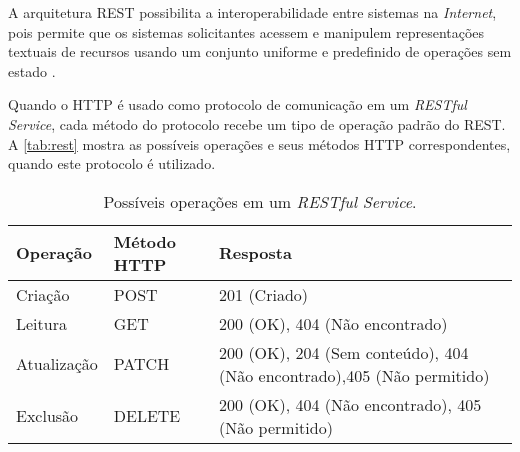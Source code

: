 	A arquitetura REST possibilita a interoperabilidade entre sistemas na \textit{Internet}, pois permite que os sistemas solicitantes acessem e manipulem representações textuais de recursos usando um conjunto uniforme e predefinido de operações sem estado \cite{ferris2004webservices}.
	
	Quando o HTTP é usado como protocolo de comunicação em um \textit{RESTful Service}, cada método do protocolo recebe um tipo de operação padrão do REST. A \autoref{tab:rest} mostra as possíveis operações e seus métodos HTTP correspondentes, quando este protocolo é utilizado.
	

	\begin{table}[htb]
		\centering
		\footnotesize
		\caption{Possíveis operações em um \textit{RESTful Service}.}
		\label{tab:rest}
		\begin{tabular}{p{2cm}p{2cm}p{8cm}}
			\hline
			\textbf{Operação} &
			\textbf{Método \newline HTTP} &
			\textbf{Resposta} \\[5mm]

			\hline
			Criação &
			POST &
			201 (Criado) \\[5mm]
			
			\hline
			Leitura &
			GET &
			200 (OK), 404 (Não encontrado)  \\[5mm]
			
			\hline
			Atualização &
			PATCH &
			200 (OK), 204 (Sem conteúdo), 404 (Não encontrado),405 (Não permitido) \\[5mm]
			
			
			\hline
			Exclusão &
			DELETE &
			200 (OK), 404 (Não encontrado), 405 (Não permitido) \\[5mm]
			
			\hline
		\end{tabular}
	\end{table}
